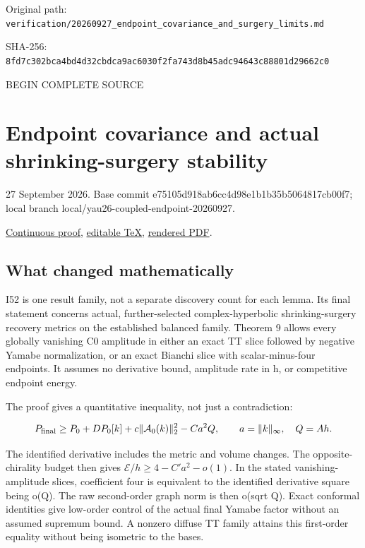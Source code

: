 \documentclass[
  10pt,
]{article}
\begin{document}
Original path:
\nolinkurl{verification/20260927_endpoint_covariance_and_surgery_limits.md}

SHA-256:
\nolinkurl{8fd7c302bca4bd4d32cbdca9ac6030f2fa743d8b45adc94643c88801d29662c0}

BEGIN COMPLETE SOURCE

\hypertarget{endpoint-covariance-and-actual-shrinking-surgery-stability}{%
\section{Endpoint covariance and actual shrinking-surgery
stability}\label{endpoint-covariance-and-actual-shrinking-surgery-stability}}

27 September 2026. Base commit e75105d918ab6cc4d98e1b1b35b5064817cb00f7;
local branch local/yau26-coupled-endpoint-20260927.

\href{../continuation/20260927_endpoint_covariance_and_surgery_limits.md}{Continuous
proof},
\href{../continuation/20260927_endpoint_covariance_and_surgery_limits.tex}{editable
TeX},
\href{../continuation/20260927_endpoint_covariance_and_surgery_limits.pdf}{rendered
PDF}.

\hypertarget{what-changed-mathematically}{%
\subsection{What changed
mathematically}\label{what-changed-mathematically}}

I52 is one result family, not a separate discovery count for each lemma.
Its final statement concerns actual, further-selected complex-hyperbolic
shrinking-surgery recovery metrics on the established balanced family.
Theorem 9 allows every globally vanishing C0 amplitude in either an
exact TT slice followed by negative Yamabe normalization, or an exact
Bianchi slice with scalar-minus-four endpoints. It assumes no derivative
bound, amplitude rate in h, or competitive endpoint energy.

The proof gives a quantitative inequality, not just a contradiction:

\[
P_{\rm final}\ge P_0+DP_0[k]+c\|\mathcal A_0(k)\|_2^2-Ca^2Q,
\qquad a=\|k\|_\infty,\quad Q=Ah.
\]

The identified derivative includes the metric and volume changes. The
opposite-chirality budget then gives \(\mathcal E/h\ge4-C'a^2-o(1)\). In
the stated vanishing-amplitude slices, coefficient four is equivalent to
the identified derivative square being o(Q). The raw second-order graph
norm is then o(sqrt Q). Exact conformal identities give low-order
control of the actual final Yamabe factor without an assumed supremum
bound. A nonzero diffuse TT family attains this first-order equality
without being isometric to the bases.
\end{document}
